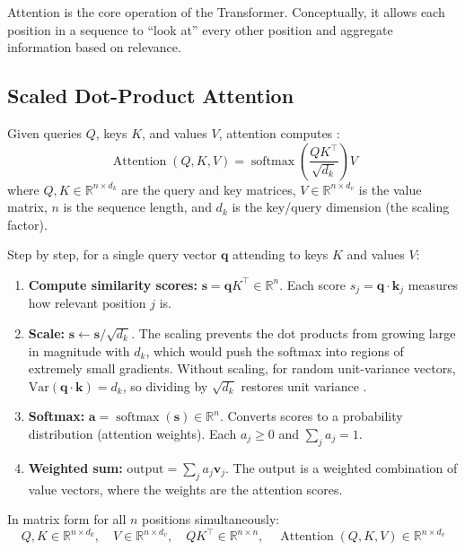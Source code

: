 \documentclass[11pt,a4paper]{article}
\newcommand{\R}{\mathbb{R}}
\newcommand{\softmax}{\operatorname{softmax}}
\newcommand{\Attention}{\operatorname{Attention}}
\newcommand{\dk}{d_k}
\newcommand{\dv}{d_v}
\begin{document}
Attention is the core operation of the Transformer. Conceptually, it allows each position
in a sequence to ``look at'' every other position and aggregate information based on
relevance.

\subsection{Scaled Dot-Product Attention}

Given queries $Q$, keys $K$, and values $V$, attention computes \cite{vaswani2017}:
\begin{equation}
\label{eq:attention}
  \Attention(Q, K, V) = \softmax\!\left(\frac{QK^\top}{\sqrt{\dk}}\right) V
\end{equation}
where $Q, K \in \R^{n \times \dk}$ are the query and key matrices, $V \in \R^{n \times \dv}$
is the value matrix, $n$ is the sequence length, and $\dk$ is the key/query dimension
(the scaling factor).

Step by step, for a single query vector $\bm{q}$ attending to keys $K$ and values $V$:

\begin{enumerate}[nosep]
  \item \textbf{Compute similarity scores:} $\bm{s} = \bm{q} K^\top \in \R^n$. Each
    score $s_j = \bm{q} \cdot \bm{k}_j$ measures how relevant position $j$ is.
  \item \textbf{Scale:} $\bm{s} \leftarrow \bm{s} / \sqrt{\dk}$. The scaling prevents
    the dot products from growing large in magnitude with $\dk$, which would push the
    softmax into regions of extremely small gradients. Without scaling, for random unit-variance
    vectors, $\text{Var}(\bm{q} \cdot \bm{k}) = \dk$, so dividing by $\sqrt{\dk}$
    restores unit variance \cite{vaswani2017}.
  \item \textbf{Softmax:} $\bm{a} = \softmax(\bm{s}) \in \R^n$. Converts scores to a
    probability distribution (attention weights). Each $a_j \geq 0$ and $\sum_j a_j = 1$.
  \item \textbf{Weighted sum:} $\text{output} = \sum_j a_j \bm{v}_j$. The output is a
    weighted combination of value vectors, where the weights are the attention scores.
\end{enumerate}

In matrix form for all $n$ positions simultaneously:
\begin{equation}
  Q, K \in \R^{n \times \dk}, \quad
  V \in \R^{n \times \dv}, \quad
  QK^\top \in \R^{n \times n}, \quad
  \Attention(Q, K, V) \in \R^{n \times \dv}
\end{equation}
\end{document}
